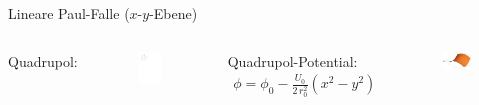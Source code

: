 \documentclass[12pt]{beamer}
\begin{document}
\begin{frame}{Lineare Paul-Falle ($x$-$y$-Ebene)}
	\begin{columns}[t]
		Quadrupol:
		\begin{figure}[h]
			\centering
			\includegraphics[width=0.8\textwidth]{./figures/lineare_paulfalle_xy_statisch_swapped.pdf}
		\end{figure}
		
		Quadrupol-Potential:
		\begin{align}
		\phi = \phi_0 - \frac{U_0}{2 \, r_0^2} (x^2-y^2)
		\end{align}
		\begin{figure}[h]
			\centering
			\includegraphics[width=0.95\textwidth]{./figures/sattelpotential2.pdf}
		\end{figure}
	\end{columns}
\end{frame}
\end{document}
